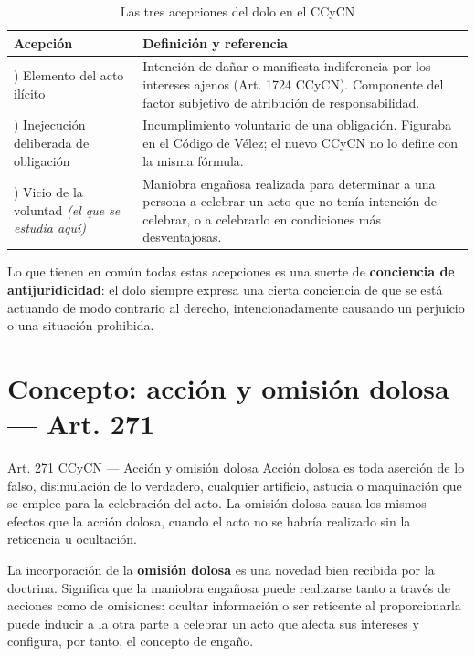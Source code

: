 \documentclass[12pt,oneside]{book}
\begin{document}
\begin{table}[H]
\centering
\begin{tabularx}{\textwidth}{>{\raggedright\arraybackslash}p{} >{\raggedright\arraybackslash}X}
\toprule
\textbf{Acepción} & \textbf{Definición y referencia} \\
\midrule
1) Elemento del acto ilícito & Intención de dañar o manifiesta indiferencia por los intereses ajenos (Art. 1724 CCyCN). Componente del factor subjetivo de atribución de responsabilidad. \\[4pt]
2) Inejecución deliberada de obligación & Incumplimiento voluntario de una obligación. Figuraba en el Código de Vélez; el nuevo CCyCN no lo define con la misma fórmula. \\[4pt]
3) Vicio de la voluntad \emph{(el que se estudia aquí)} & Maniobra engañosa realizada para determinar a una persona a celebrar un acto que no tenía intención de celebrar, o a celebrarlo en condiciones más desventajosas. \\
\bottomrule
\end{tabularx}
\caption{Las tres acepciones del dolo en el CCyCN}
\end{table}

Lo que tienen en común todas estas acepciones es una suerte de \textbf{conciencia de antijuridicidad}: el dolo siempre expresa una cierta conciencia de que se está actuando de modo contrario al derecho, intencionadamente causando un perjuicio o una situación prohibida.

\section{Concepto: acción y omisión dolosa --- Art. 271}

\begin{articulo}{Art. 271 CCyCN --- Acción y omisión dolosa}
Acción dolosa es toda aserción de lo falso, disimulación de lo verdadero, cualquier artificio, astucia o maquinación que se emplee para la celebración del acto. La omisión dolosa causa los mismos efectos que la acción dolosa, cuando el acto no se habría realizado sin la reticencia u ocultación.
\end{articulo}

La incorporación de la \textbf{omisión dolosa} es una novedad bien recibida por la doctrina. Significa que la maniobra engañosa puede realizarse tanto a través de acciones como de omisiones: ocultar información o ser reticente al proporcionarla puede inducir a la otra parte a celebrar un acto que afecta sus intereses y configura, por tanto, el concepto de engaño.
\end{document}
